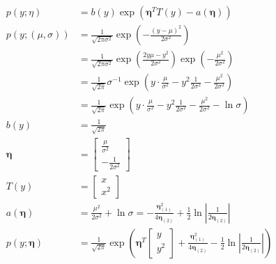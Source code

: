 \documentclass{article}
\renewcommand{\pmb}[1]{\boldsymbol{#1}}
\begin{document}
\begin{align*}
    p(y;\eta) &= b(y) \exp \left( \pmb\eta^T T(y) - a(\pmb\eta) \right) \\
    p(y;(\mu, \sigma)) &= \frac{1}{\sqrt{2\pi\sigma^2}} \exp{\left( -\frac{(y - \mu)^2}{2\sigma^2} \right)} \\
    &= \frac{1}{\sqrt{2\pi\sigma^2}} \exp{\left( \frac{2y\mu - y^2}{2\sigma^2} \right)} \exp{\left( -\frac{ \mu^2}{2\sigma^2} \right)} \\
    &= \frac{1}{\sqrt{2\pi}} \sigma^{-1} \exp{\left( y \cdot \frac{\mu}{\sigma^2} - y^2 \frac{1}{2\sigma^2} -\frac{ \mu^2}{2\sigma^2} \right)} \\
    &= \frac{1}{\sqrt{2\pi}}\exp{\left( y \cdot \frac{\mu}{\sigma^2} - y^2 \frac{1}{2\sigma^2} - \frac{ \mu^2}{2\sigma^2} - \ln \sigma \right)} \\
    b(y) &= \frac{1}{\sqrt{2\pi}} \\ 
    \pmb\eta &= \begin{bmatrix}
        \displaystyle\frac{\mu}{\sigma^2} \\ 
        \displaystyle -\frac{1}{2\sigma^2}
    \end{bmatrix} \\
    T(y) &= \begin{bmatrix}
        x \\ 
        x^2
    \end{bmatrix} \\ 
    a(\pmb\eta) &= \frac{ \mu^2}{2\sigma^2} + \ln \sigma = - \frac{\pmb{\eta}_{(1)}^2}{4 \pmb\eta_{(2)}} + \frac{1}{2} \ln \left| \frac{1}{2\pmb{\eta}_{(2)}} \right| \\ 
    p(y; \pmb\eta) &= \frac{1}{\sqrt{2\pi}} \exp \left( \pmb\eta^T \begin{bmatrix} y \\ y^2 \end{bmatrix} + \frac{\pmb{\eta}_{(1)}^2}{4 \pmb\eta_{(2)}} - \frac{1}{2} \ln \left| \frac{1}{2\pmb{\eta}_{(2)}} \right| \right)
\end{align*}
\end{document}

